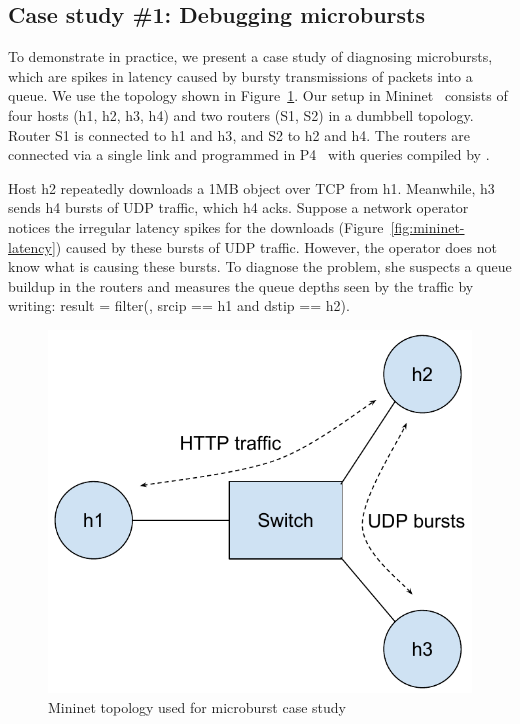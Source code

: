 \subsection{Case study \#1: Debugging microbursts}
\label{s:eval:mininet}
\label{sec:eval:mininet}

To demonstrate \TheSystem in practice, we present a case study of diagnosing
microbursts, which are spikes in latency caused by bursty transmissions of
packets into a queue. We use the topology shown in
Figure~\ref{fig:mininet-topo}.  Our setup in Mininet~\cite{mininet} consists of
four hosts ({\ct h1, h2, h3, h4}) and two routers ({\ct S1, S2}) in a dumbbell
topology.  Router {\ct S1} is connected to {\ct h1} and {\ct h3}, and {\ct S2}
to {\ct h2} and {\ct h4}.  The routers are connected via a single link and
programmed in P4~\cite{p4-bmv2} with queries compiled by \TheSystem.

Host {\ct h2} repeatedly downloads a 1MB object over TCP from {\ct h1}.
Meanwhile, {\ct h3} sends {\ct h4} bursts of UDP traffic, which {\ct h4} acks.
Suppose a network operator notices the irregular latency spikes for the
downloads (Figure~\ref{fig:mininet-latency}) caused by these bursts of UDP
traffic.  However, the operator does not know what is causing these bursts. To
diagnose the problem, she suspects a queue buildup in the routers and measures
the queue depths seen by the traffic by writing: {\ct result = filter(\pktlog,
srcip == h1 and dstip == h2).}

\begin{figure}[ht]
\centering
\includegraphics[width=0.4\columnwidth]{mininet-topo.pdf}
\caption{Mininet topology used for microburst case study}
\label{fig:mininet-topo}
\end{figure}

